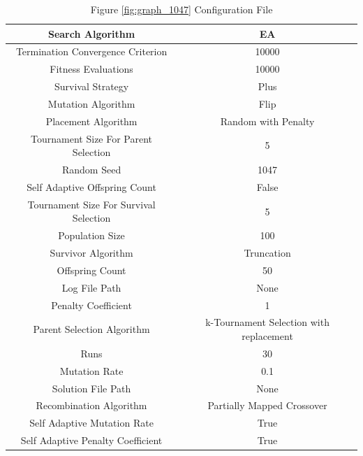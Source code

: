 \documentclass{standalone}
\begin{document}
\begin{table}[!htb]
	\centering
	\caption{Figure \ref{fig:graph_1047} Configuration File}
	\label{tab:graph_1047}
	\begin{tabular}{| c | c |}
		\hline
		Search Algorithm		& EA		 \\
		\hline
		Termination Convergence Criterion		& 10000		 \\
		\hline
		Fitness Evaluations		& 10000		 \\
		\hline
		Survival Strategy		& Plus		 \\
		\hline
		Mutation Algorithm		& Flip		 \\
		\hline
		Placement Algorithm		& Random with Penalty		 \\
		\hline
		Tournament Size For Parent Selection		& 5		 \\
		\hline
		Random Seed		& 1047		 \\
		\hline
		Self Adaptive Offspring Count		& False		 \\
		\hline
		Tournament Size For Survival Selection		& 5		 \\
		\hline
		Population Size		& 100		 \\
		\hline
		Survivor Algorithm		& Truncation		 \\
		\hline
		Offspring Count		& 50		 \\
		\hline
		Log File Path		& None		 \\
		\hline
		Penalty Coefficient		& 1		 \\
		\hline
		Parent Selection Algorithm		& k-Tournament Selection with replacement		 \\
		\hline
		Runs		& 30		 \\
		\hline
		Mutation Rate		& 0.1		 \\
		\hline
		Solution File Path		& None		 \\
		\hline
		Recombination Algorithm		& Partially Mapped Crossover		 \\
		\hline
		Self Adaptive Mutation Rate		& True		 \\
		\hline
		Self Adaptive Penalty Coefficient		& True		 \\
		\hline
	\end{tabular}
\end{table}
\end{document}

